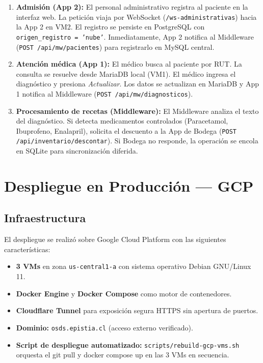 \documentclass[11pt,a4paper]{article}
\begin{document}
\begin{enumerate}
    \item \textbf{Admisión (App 2):} El personal administrativo registra al paciente
          en la interfaz web. La petición viaja por WebSocket (\texttt{/ws-administrativas})
          hacia la App 2 en VM2. El registro se persiste en PostgreSQL con
          \texttt{origen\_registro = 'nube'}. Inmediatamente, App 2 notifica al
          Middleware (\texttt{POST /api/mw/pacientes}) para registrarlo en MySQL central.
    \item \textbf{Atención médica (App 1):} El médico busca al paciente por RUT.
          La consulta se resuelve desde MariaDB local (VM1). El médico ingresa el
          diagnóstico y presiona \emph{Actualizar}. Los datos se actualizan en MariaDB
          y App 1 notifica al Middleware (\texttt{POST /api/mw/diagnosticos}).
    \item \textbf{Procesamiento de recetas (Middleware):} El Middleware analiza el
          texto del diagnóstico. Si detecta medicamentos controlados (Paracetamol,
          Ibuprofeno, Enalapril), solicita el descuento a la App de Bodega
          (\texttt{POST /api/inventario/descontar}). Si Bodega no responde, la
          operación se encola en SQLite para sincronización diferida.
\end{enumerate}

\section{Despliegue en Producción — GCP}

\subsection{Infraestructura}

El despliegue se realizó sobre Google Cloud Platform con las siguientes
características:

\begin{itemize}
    \item \textbf{3 VMs} en zona \texttt{us-central1-a} con sistema operativo Debian GNU/Linux 11.
    \item \textbf{Docker Engine} y \textbf{Docker Compose} como motor de contenedores.
    \item \textbf{Cloudflare Tunnel} para exposición segura HTTPS sin apertura de puertos.
    \item \textbf{Dominio:} \texttt{osds.epistia.cl} (acceso externo verificado).
    \item \textbf{Script de despliegue automatizado:} \texttt{scripts/rebuild-gcp-vms.sh}
          orquesta el git pull y docker compose up en las 3 VMs en secuencia.
\end{itemize}
\end{document}
